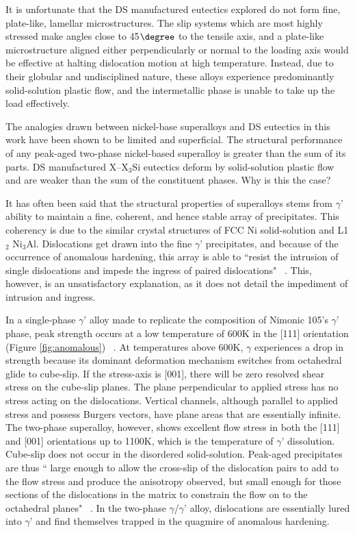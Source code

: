 It is unfortunate that the DS manufactured eutectics explored do not form fine, plate-like, lamellar microstructures.  The slip systems which are most highly stressed make angles close to 45$\degree$ to the tensile axis, and a plate-like microstructure aligned either perpendicularly or normal to the loading axis would be effective at halting dislocation motion at high temperature.  Instead, due to their globular and undisciplined nature, these alloys experience predominantly solid-solution plastic flow, and the intermetallic phase is unable to take up the load effectively.
 
The analogies drawn between nickel-base superalloys and DS eutectics in this work have been shown to be limited and superficial.  The structural performance of any peak-aged two-phase nickel-based superalloy is greater than the sum of its parts.  DS manufactured X--X$_3$Si eutectics deform by solid-solution plastic flow and are weaker than the sum of the constituent phases.  Why is this the case?

It has often been said that the structural properties of superalloys stems from $\gamma$' ability to maintain a fine, coherent, and hence stable array of precipitates.  This coherency is due to the similar crystal structures of FCC Ni solid-solution and L1$_2$ Ni$_3$Al.  Dislocations get drawn into the fine $\gamma$' precipitates, and because of the occurrence of anomalous hardening, this array is able to ``resist the intrusion of single dislocations and impede the ingress of paired dislocations" ~\cite{cathie12}.  This, however, is an unsatisfactory explanation, as it does not detail the impediment of intrusion and ingress.  

In a single-phase $\gamma$' alloy made to replicate the composition of Nimonic 105's $\gamma$' phase, peak strength occurs at a low temperature of 600K in the [111] orientation (Figure \ref{fig:anomalous}) ~\cite{nembach00}.  At temperatures above 600K, $\gamma$ experiences a drop in strength because its dominant deformation mechanism switches from octahedral glide to cube-slip.  If the stress-axis is [001], there will be zero resolved shear stress on the cube-slip planes.  The plane perpendicular to applied stress has no stress acting on the dislocations.  Vertical channels, although parallel to applied stress and possess Burgers vectors, have plane areas that are essentially infinite.  The two-phase superalloy, however, shows excellent flow stress in both the [111] and [001] orientations up to 1100K, which is the temperature of $\gamma$' dissolution.  Cube-slip does not occur in the disordered solid-solution.  Peak-aged precipitates are thus `` large enough to allow the cross-slip of the dislocation pairs to add to the flow stress and produce the anisotropy observed, but small enough for those sections of the dislocations in the matrix to constrain the flow on to the octahedral planes" ~\cite{cathie12}.  In the two-phase $\gamma$/$\gamma$' alloy, dislocations are essentially  lured into $\gamma$' and find themselves trapped in the quagmire of anomalous hardening.

